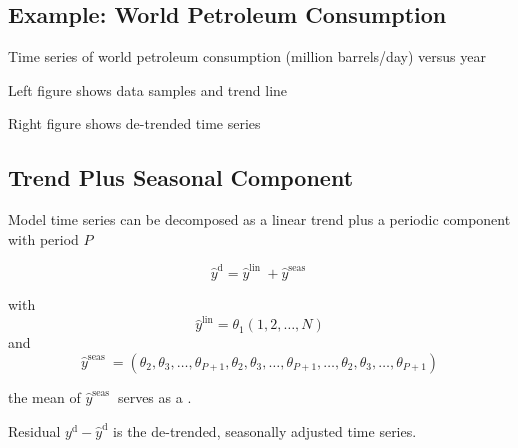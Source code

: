 \subsection{Example: World Petroleum Consumption}


Time series of world petroleum consumption (million barrels/day) versus year

Left figure shows data samples and trend line

Right figure shows de-trended time series


\subsection{Trend Plus Seasonal Component}

\begin{proposition}
    Model time series can be decomposed as a linear trend plus a periodic component with period $ P $

    \begin{equation}
    \hat{y}^{\mathrm{d}}=\hat{y}^{\text {lin }}+\hat{y}^{\text {seas }}
    \end{equation}

    with \begin{equation} \hat{y}^{\operatorname{lin}}=\theta_{1}(1,2, \ldots, N) \end{equation} and
\begin{equation}
\hat{y}^{\text {seas }}=\left(\theta_{2}, \theta_{3}, \ldots, \theta_{P+1}, \theta_{2}, \theta_{3}, \ldots, \theta_{P+1}, \ldots, \theta_{2}, \theta_{3}, \ldots, \theta_{P+1}\right)
\end{equation}
\end{proposition}

\begin{definition}[Offset]
    the mean of $ \hat{y}^{\text {seas }} $ serves as a .
\end{definition}

\begin{definition}
    Residual $ y^{\mathrm{d}}-\hat{y}^{\mathrm{d}} $ is the de-trended, seasonally adjusted time series.
\end{definition}

